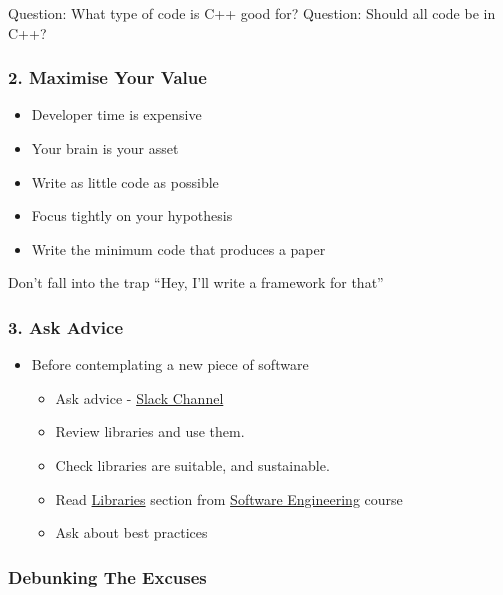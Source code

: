 Question: What type of code is C++ good for? Question: Should all code
be in C++?

\subsubsection{2. Maximise Your Value}\label{maximise-your-value}

\begin{itemize}
\itemsep1pt\parskip0pt
\item
  Developer time is expensive
\item
  Your brain is your asset
\item
  Write as little code as possible
\item
  Focus tightly on your hypothesis
\item
  Write the minimum code that produces a paper
\end{itemize}

Don't fall into the trap ``Hey, I'll write a framework for that''

\subsubsection{3. Ask Advice}\label{ask-advice}

\begin{itemize}
\itemsep1pt\parskip0pt
\item
  Before contemplating a new piece of software

  \begin{itemize}
  \itemsep1pt\parskip0pt
  \item
    Ask advice - \href{https://ucl-programming-hub.slack.com/}{Slack
    Channel}
  \item
    Review libraries and use them.
  \item
    Check libraries are suitable, and sustainable.
  \item
    Read
    \href{http://development.rc.ucl.ac.uk/training/engineering/ch04packaging/01Libraries.html}{Libraries}
    section from
    \href{http://github-pages.ucl.ac.uk/rsd-engineeringcourse/}{Software
    Engineering} course
  \item
    Ask about best practices
  \end{itemize}
\end{itemize}

\subsubsection{Debunking The Excuses}\label{debunking-the-excuses}

